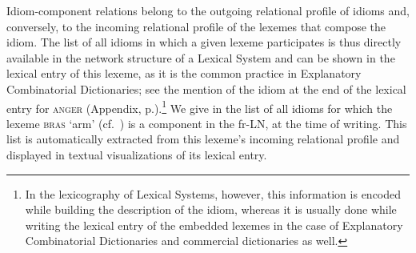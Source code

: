 Idiom-component relations belong to the outgoing relational profile of idioms and, conversely, to the incoming relational profile of the lexemes that compose the idiom. The list of all idioms in which a given lexeme participates is thus directly available in the network structure of a Lexical System and can be shown in the lexical entry of this lexeme, as it is the common practice in Explanatory Combinatorial Dictionaries; see the mention of the idiom  at the end of the lexical entry for \textsc{anger} (Appendix, p.\thinspace\pageref{sec:AppendixIdiom}).\footnote{In the lexicography of Lexical Systems, however, this information is encoded while building the description of the idiom, whereas it is usually done while writing the lexical entry of the embedded lexemes in the case of Explanatory Combinatorial Dictionaries and commercial dictionaries as well.} We give in  the list of all idioms for which the lexeme \textsc{bras} `arm' (cf.~) is a component in the fr-LN, at the time of writing. This list is automatically extracted from this lexeme's incoming relational profile and displayed in textual visualizations of its lexical entry.

